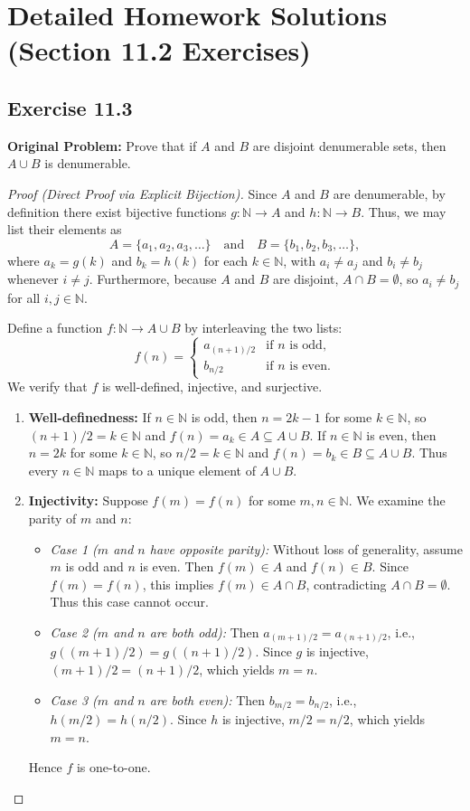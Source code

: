 \documentclass[11pt, letterpaper]{article}
\theoremstyle{definition}
\theoremstyle{remark}
\begin{document}
\section{Detailed Homework Solutions (Section 11.2 Exercises)}

\subsection*{Exercise 11.3}
\textbf{Original Problem:} Prove that if $A$ and $B$ are disjoint denumerable sets, then $A \cup B$ is denumerable.

\begin{proof}[Proof (Direct Proof via Explicit Bijection)]
Since $A$ and $B$ are denumerable, by definition there exist bijective functions $g : \mathbb{N} \to A$ and $h : \mathbb{N} \to B$. Thus, we may list their elements as
\[
A = \{a_1, a_2, a_3, \dots\} \quad \text{and} \quad B = \{b_1, b_2, b_3, \dots\},
\]
where $a_k = g(k)$ and $b_k = h(k)$ for each $k \in \mathbb{N}$, with $a_i \neq a_j$ and $b_i \neq b_j$ whenever $i \neq j$. Furthermore, because $A$ and $B$ are disjoint, $A \cap B = \emptyset$, so $a_i \neq b_j$ for all $i, j \in \mathbb{N}$.

Define a function $f : \mathbb{N} \to A \cup B$ by interleaving the two lists:
\[
f(n) =
\begin{cases}
a_{(n+1)/2} & \text{if } n \text{ is odd}, \\
b_{n/2} & \text{if } n \text{ is even}.
\end{cases}
\]
We verify that $f$ is well-defined, injective, and surjective.
\begin{enumerate}[label=(\arabic*)]
    \item \textbf{Well-definedness:} If $n \in \mathbb{N}$ is odd, then $n = 2k - 1$ for some $k \in \mathbb{N}$, so $(n+1)/2 = k \in \mathbb{N}$ and $f(n) = a_k \in A \subseteq A \cup B$. If $n \in \mathbb{N}$ is even, then $n = 2k$ for some $k \in \mathbb{N}$, so $n/2 = k \in \mathbb{N}$ and $f(n) = b_k \in B \subseteq A \cup B$. Thus every $n \in \mathbb{N}$ maps to a unique element of $A \cup B$.
    
    \item \textbf{Injectivity:} Suppose $f(m) = f(n)$ for some $m, n \in \mathbb{N}$. We examine the parity of $m$ and $n$:
    \begin{itemize}
        \item \textit{Case 1 ($m$ and $n$ have opposite parity):} Without loss of generality, assume $m$ is odd and $n$ is even. Then $f(m) \in A$ and $f(n) \in B$. Since $f(m) = f(n)$, this implies $f(m) \in A \cap B$, contradicting $A \cap B = \emptyset$. Thus this case cannot occur.
        \item \textit{Case 2 ($m$ and $n$ are both odd):} Then $a_{(m+1)/2} = a_{(n+1)/2}$, i.e., $g((m+1)/2) = g((n+1)/2)$. Since $g$ is injective, $(m+1)/2 = (n+1)/2$, which yields $m = n$.
        \item \textit{Case 3 ($m$ and $n$ are both even):} Then $b_{m/2} = b_{n/2}$, i.e., $h(m/2) = h(n/2)$. Since $h$ is injective, $m/2 = n/2$, which yields $m = n$.
    \end{itemize}
    Hence $f$ is one-to-one.
    

\end{enumerate}
\end{proof}
\end{document}
